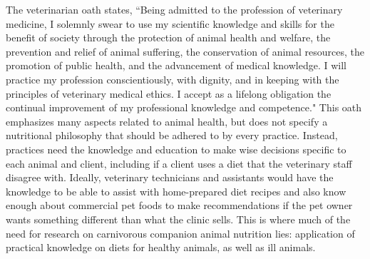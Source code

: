 \par The veterinarian oath states, ``Being admitted to the profession of veterinary medicine, I solemnly swear to use my scientific knowledge and skills for the benefit of society through the protection of animal health and welfare, the prevention and relief of animal suffering, the conservation of animal resources, the promotion of public health, and the advancement of medical knowledge. I will practice my profession conscientiously, with dignity, and in keeping with the principles of veterinary medical ethics. I accept as a lifelong obligation the continual improvement of my professional knowledge and competence."\citep{avma} This oath emphasizes many aspects related to animal health, but does not specify a nutritional philosophy that should be adhered to by every practice. Instead, practices need the knowledge and education to make wise decisions specific to each animal and client, including if a client uses a diet that the veterinary staff disagree with. Ideally, veterinary technicians and assistants would have the knowledge to be able to assist with home-prepared diet recipes and also know enough about commercial pet foods to make recommendations if the pet owner wants something different than what the clinic sells. This is where much of the need for research on carnivorous companion animal nutrition lies: application of practical knowledge on diets for healthy animals, as well as ill animals.


